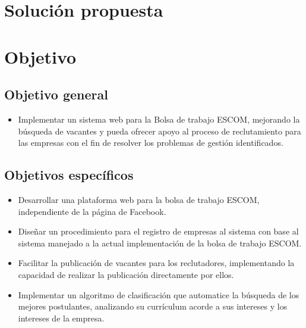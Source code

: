 \section{Solución propuesta}

\section{Objetivo}
\subsection{Objetivo general}
\begin{itemize}
    \item Implementar un sistema web para la Bolsa de trabajo ESCOM, mejorando la búsqueda de vacantes y pueda 
    ofrecer apoyo al proceso de reclutamiento para las empresas con el fin de resolver los problemas de gestión 
    identificados.
\end{itemize}

\subsection{Objetivos específicos}
        \begin{itemize}
            \item Desarrollar una plataforma web para la bolsa de trabajo ESCOM, independiente de la página de Facebook.
            \item Diseñar un procedimiento para el registro de empresas al sistema con base al sistema manejado a la actual 
            implementación de la bolsa de trabajo ESCOM.
            \item Facilitar la publicación de vacantes para los reclutadores, implementando la capacidad de realizar la
            publicación directamente por ellos.
            \item Implementar un algoritmo de clasificación que automatice la búsqueda de los mejores postulantes, analizando su 
            currículum acorde a sus intereses y los intereses de la empresa.
        \end{itemize}




